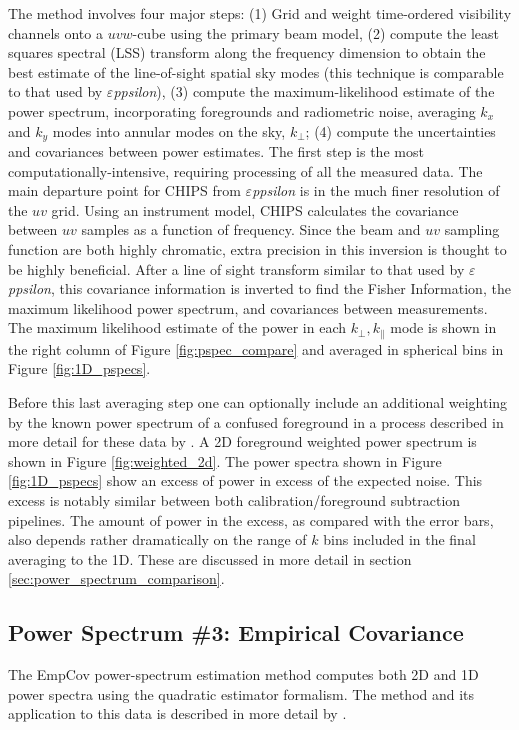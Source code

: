 \documentclass[twolcolumn,iop]{emulateapj}
\def\eppsilon{{\it $\varepsilon$ppsilon}}
\def\empirical{EmpCov}
\def\chipscite{\cite{2016arXiv160102073T}}
\def\dilloncite{\cite{PhysRevD.91.123011} }
\begin{document}
The method involves four major steps: (1) Grid and weight time-ordered visibility channels onto a $uvw$-cube using the primary beam model, (2) compute the least squares spectral (LSS) transform along the frequency dimension to obtain the best estimate of the line-of-sight spatial sky modes (this technique is comparable to that used by \eppsilon), (3) compute the maximum-likelihood estimate of the power spectrum, incorporating foregrounds and radiometric noise,  averaging $k_x$ and $k_y$ modes into annular modes on the sky, $k_\bot$; (4) compute the uncertainties and covariances between power estimates. The first step is the most computationally-intensive, requiring processing of all the measured data. The main departure point for CHIPS from \eppsilon{} is in the much finer resolution of the $uv$ grid.  Using an instrument model, CHIPS calculates the covariance between $uv$ samples as a function of frequency.  Since the beam and $uv$ sampling function are both highly chromatic, extra precision in this inversion is thought to be highly beneficial. After a line of sight transform similar to that used by \eppsilon{}, this covariance information is inverted to find the Fisher Information, the maximum likelihood power spectrum, and covariances between measurements.  The maximum likelihood estimate of the power in each $k_\bot,k_\parallel$ mode is shown in the right column of Figure \ref{fig:pspec_compare} and averaged in spherical bins in Figure \ref{fig:1D_pspecs}. 

Before this last averaging step one can optionally include an additional weighting by the known power spectrum of a confused foreground in a process described in more detail for these data by \chipscite{}.  A 2D foreground weighted power spectrum is shown in Figure \ref{fig:weighted_2d}. The power spectra shown in Figure \ref{fig:1D_pspecs} show an excess of power in excess of the expected noise. This excess is notably similar between both calibration/foreground subtraction pipelines. The amount of power in the excess, as compared with the error bars, also depends rather dramatically on the range of $k$ bins included in the final averaging to the 1D.  These are discussed in more detail in section \ref{sec:power_spectrum_comparison}.

\subsection{Power Spectrum \#3: Empirical Covariance}
\label{sec:empirical_cov}

The \empirical{} power-spectrum estimation method computes both 2D and 1D power spectra using the quadratic estimator formalism. The method and its application to this data is described in more detail by \dilloncite{}.
\end{document}
